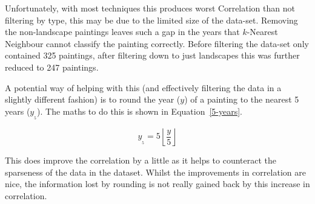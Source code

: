 Unfortunately, with most techniques this produces worst Correlation than not filtering by type,
this may be due to the limited size of the data-set. Removing the non-landscape 
paintings leaves such a gap in the years that $k$-Nearest Neighbour cannot classify the painting
correctly. Before filtering the data-set only contained 325 paintings, after filtering down to just
landscapes this was further reduced to 247 paintings.

A potential way of helping with this (and effectively filtering the data in a slightly different
fashion) is to round the year ($y$) of a painting to the nearest 5 years ($y_{_{5}}$). The maths 
to do this is shown in Equation~\ref{5-years}. 

\begin{equation}\label{5-years}
y_{_{5}} = 5\left\lfloor\frac{y}{5} \right\rfloor
\end{equation}

This does improve the correlation by a little as it helps to counteract the sparseness of the data
in the dataset. Whilst the improvements in correlation are nice, the information lost by rounding
is not really gained back by this increase in correlation.
